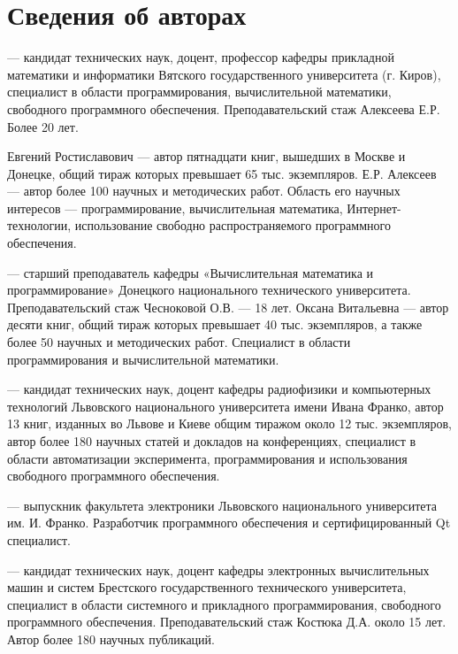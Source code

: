 \chapter{Сведения об авторах}

 --- кандидат технических наук, доцент, профессор кафедры 
прикладной математики и информатики Вятского
государственного университета (г. Киров), специалист в области программирования,
вычислительной математики, свободного программного обеспечения. Преподавательский стаж Алексеева Е.Р. Более 20 лет.

Евгений Ростиславович --- автор пятнадцати книг, вышедших в Москве и Донецке, общий тираж которых превышает 65 тыс.
экземпляров. Е.Р. Алексеев --- автор более 100 научных и методических работ. Область его научных интересов —
программирование, вычислительная математика, Интернет-технологии, использование свободно распространяемого программного
обеспечения.

 --- старший преподаватель кафедры «Вычислительная математика и программирование» Донецкого
национального технического университета. Преподавательский стаж Чесноковой О.В. --- 18 лет. Оксана Витальевна --- автор
десяти книг, общий тираж которых превышает 40 тыс. экземпляров, а также более 50 научных и методических работ.
Специалист в области программирования и вычислительной математики.


 --- кандидат технических наук, доцент кафедры радиофизики и компьютерных технологий Львовского
национального университета имени Ивана Франко, автор 13 книг, изданных во Львове и Киеве общим тиражом около 12 тыс.
экземпляров, автор более 180 научных статей и докладов на конференциях, специалист в области автоматизации
эксперимента, программирования и использования свободного программного обеспечения.


 --- выпускник факультета электроники Львовского национального университета им. И. Франко.
Разработчик программного обеспечения и сертифицированный Qt специалист.


 --- кандидат технических наук, доцент кафедры электронных вычислительных машин и систем
Брестского государственного технического университета, специалист в области системного и прикладного программирования,
свободного программного обеспечения. Преподавательский стаж Костюка Д.А. около 15 лет. Автор более 180 научных
публикаций.
